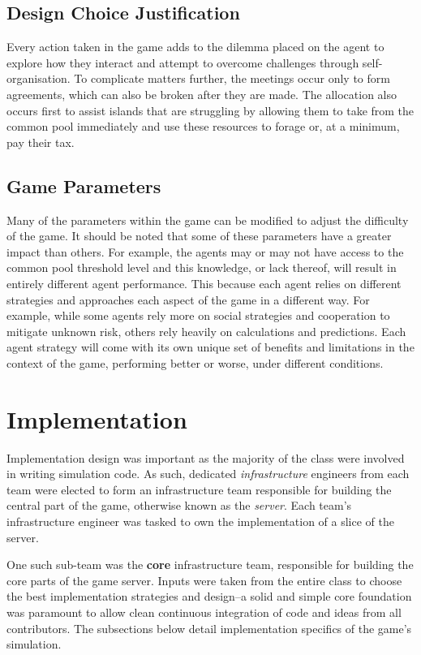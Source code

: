 \subsection{Design Choice Justification}
Every action taken in the game adds to the dilemma placed on the agent to explore how they interact and attempt to overcome challenges through self-organisation. To complicate matters further, the meetings occur only to form agreements, which can also be broken after they are made. The allocation also occurs first to assist islands that are struggling by allowing them to take from the common pool immediately and use these resources to forage or, at a minimum, pay their tax.

\subsection{Game Parameters}
Many of the parameters within the game can be modified to adjust the difficulty of the game. It should be noted that some of these parameters have a greater impact than others. For example, the agents may or may not have access to the common pool threshold level and this knowledge, or lack thereof, will result in entirely different agent performance. This because each agent relies on different strategies and approaches each aspect of the game in a different way. For example, while some agents rely more on social strategies and cooperation to mitigate unknown risk, others rely heavily on calculations and predictions. Each agent strategy will come with its own unique set of benefits and limitations in the context of the game, performing better or worse, under different conditions.


\section{Implementation}
\label{sec:GD:implementation}

Implementation design was important as the majority of the class were involved in writing simulation code. As such, dedicated \emph{infrastructure} engineers from each team were elected to form an infrastructure team responsible for building the central part of the game, otherwise known as the \emph{server}. Each team's infrastructure engineer was tasked to own the implementation of a slice of the server.

One such sub-team was the \textbf{core} infrastructure team, responsible for building the core parts of the game server. Inputs were taken from the entire class to choose the best implementation strategies and design--a solid and simple core foundation was paramount to allow clean continuous integration of code and ideas from all contributors. The subsections below detail implementation specifics of the game's simulation.

